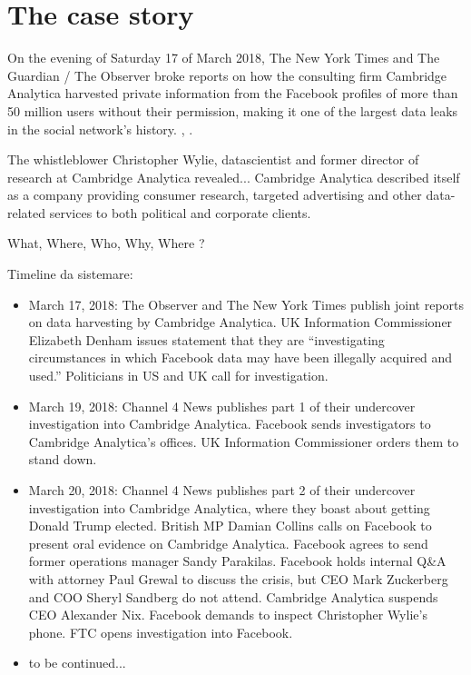 \documentclass[11pt, twoside]{report}
\begin{document}
    
    \tableofcontents
    \chapter{The case story}

On the evening of Saturday 17 of March 2018, The New York Times and The Guardian / The Observer broke reports on how the consulting firm Cambridge Analytica harvested private information from the Facebook profiles of more than 50 million users without their permission, making it one of the largest data leaks in the social network’s history. \cite{nyt_17march} , \cite{guardian}.

The whistleblower Christopher Wylie, datascientist and former director of research at Cambridge Analytica revealed...
Cambridge Analytica described itself as a company providing consumer research, targeted advertising and other data-related services to both political and corporate clients.

What, Where, Who, Why, Where ?


Timeline da sistemare: \cite{nyt_timeline}
\begin{itemize}

\item March 17, 2018: The Observer and The New York Times publish joint reports on data harvesting by Cambridge Analytica. UK Information Commissioner Elizabeth Denham issues statement that they are “investigating circumstances in which Facebook data may have been illegally acquired and used.” Politicians in US and UK call for investigation.

\item March 19, 2018: Channel 4 News publishes part 1 of their undercover investigation into Cambridge Analytica. Facebook sends investigators to Cambridge Analytica’s offices. UK Information Commissioner orders them to stand down.

\item March 20, 2018: Channel 4 News publishes part 2 of their undercover investigation into Cambridge Analytica, where they boast about getting Donald Trump elected. British MP Damian Collins calls on Facebook to present oral evidence on Cambridge Analytica. Facebook agrees to send former operations manager Sandy Parakilas. Facebook holds internal Q\&A with attorney Paul Grewal to discuss the crisis, but CEO Mark Zuckerberg and COO Sheryl Sandberg do not attend. Cambridge Analytica suspends CEO Alexander Nix. Facebook demands to inspect Christopher Wylie’s phone. FTC opens investigation into Facebook.
\item to be continued...
\end{itemize}
\end{document}

